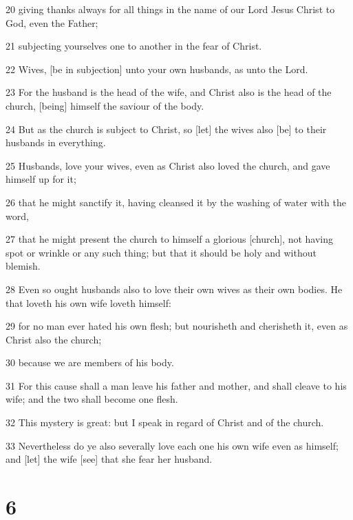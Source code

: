 \par 20 giving thanks always for all things in the name of our Lord Jesus Christ to God, even the Father;
\par 21 subjecting yourselves one to another in the fear of Christ.
\par 22 Wives, [be in subjection] unto your own husbands, as unto the Lord.
\par 23 For the husband is the head of the wife, and Christ also is the head of the church, [being] himself the saviour of the body.
\par 24 But as the church is subject to Christ, so [let] the wives also [be] to their husbands in everything.
\par 25 Husbands, love your wives, even as Christ also loved the church, and gave himself up for it;
\par 26 that he might sanctify it, having cleansed it by the washing of water with the word,
\par 27 that he might present the church to himself a glorious [church], not having spot or wrinkle or any such thing; but that it should be holy and without blemish.
\par 28 Even so ought husbands also to love their own wives as their own bodies. He that loveth his own wife loveth himself:
\par 29 for no man ever hated his own flesh; but nourisheth and cherisheth it, even as Christ also the church;
\par 30 because we are members of his body.
\par 31 For this cause shall a man leave his father and mother, and shall cleave to his wife; and the two shall become one flesh.
\par 32 This mystery is great: but I speak in regard of Christ and of the church.
\par 33 Nevertheless do ye also severally love each one his own wife even as himself; and [let] the wife [see] that she fear her husband.

\chapter{6}

